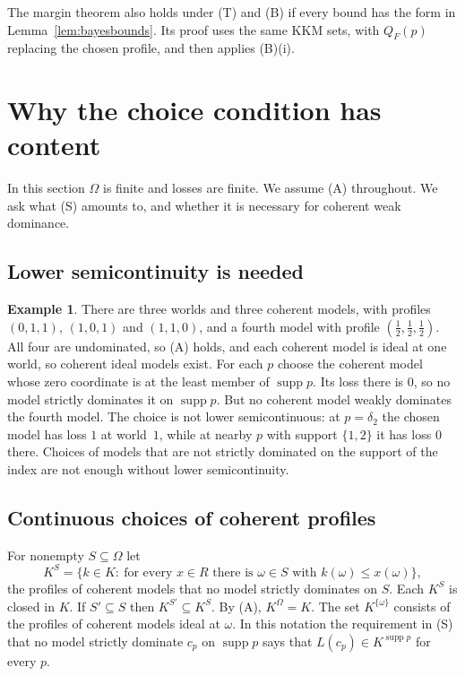 \documentclass[11pt]{article}
\theoremstyle{definition}
\newtheorem{example}[theorem]{Example}
\theoremstyle{remark}
\newcommand{\supp}{\operatorname{supp}}
\begin{document}
The margin theorem also holds under (T) and (B) if every bound has the form in Lemma~\ref{lem:bayesbounds}. Its proof uses the same KKM sets, with $Q_F(p)$ replacing the chosen profile, and then applies (B)(i).
\section{Why the choice condition has content}\label{sec:finite}
In this section $\Omega$ is finite and losses are finite. We assume (A) throughout. We ask what (S) amounts to, and whether it is necessary for coherent weak dominance.

\subsection{Lower semicontinuity is needed}
\begin{example}\label{ex:continuity-needed}
There are three worlds and three coherent models, with profiles $(0,1,1)$, $(1,0,1)$ and $(1,1,0)$, and a fourth model with profile $(\tfrac12,\tfrac12,\tfrac12)$. All four are undominated, so (A) holds, and each coherent model is ideal at one world, so coherent ideal models exist. For each $p$ choose the coherent model whose zero coordinate is at the least member of $\supp p$. Its loss there is $0$, so no model strictly dominates it on $\supp p$. But no coherent model weakly dominates the fourth model. The choice is not lower semicontinuous: at $p=\delta_2$ the chosen model has loss $1$ at world~$1$, while at nearby $p$ with support $\{1,2\}$ it has loss $0$ there. Choices of models that are not strictly dominated on the support of the index are not enough without lower semicontinuity.
\end{example}

\subsection{Continuous choices of coherent profiles}\label{sec:connect}
For nonempty $S\subseteq\Omega$ let
\[
 K^S=\{k\in K:\ \text{for every }x\in R\text{ there is }\omega\in S\text{ with }k(\omega)\le x(\omega)\},
\]
the profiles of coherent models that no model strictly dominates on $S$. Each $K^S$ is closed in $K$. If $S'\subseteq S$ then $K^{S'}\subseteq K^S$. By (A), $K^\Omega=K$. The set $K^{\{\omega\}}$ consists of the profiles of coherent models ideal at $\omega$. In this notation the requirement in (S) that no model strictly dominate $c_p$ on $\supp p$ says that $L(c_p)\in K^{\supp p}$ for every $p$.
\end{document}
